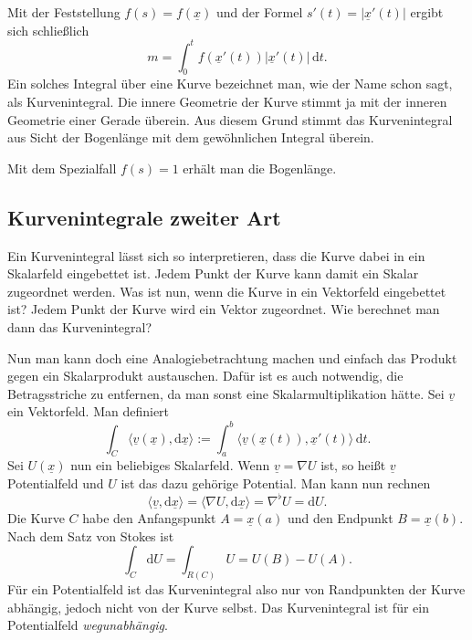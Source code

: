 \documentclass[a4paper,11pt,fleqn,twocolumn,twoside]{scrartcl}
\numberwithin{equation}{section}
\begin{document}
Mit der Feststellung $f(s) = f(\underline x)$ und der Formel
$s'(t) = |\underline x'(t)|$ ergibt sich schließlich
\begin{equation}
m = \int_0^t f(\underline x'(t))|\underline x'(t)|\,\mathrm dt.
\end{equation}
Ein solches Integral über eine Kurve bezeichnet man, wie der Name
schon sagt, als Kurvenintegral. Die innere Geometrie der Kurve stimmt
ja mit der inneren Geometrie einer Gerade überein. Aus diesem Grund
stimmt das Kurvenintegral aus Sicht der Bogenlänge mit dem
gewöhnlichen Integral überein.

Mit dem Spezialfall $f(s)=1$ erhält
man die Bogenlänge.



\subsection{Kurvenintegrale zweiter Art}

Ein Kurvenintegral lässt sich so interpretieren, dass die Kurve
dabei in ein Skalarfeld eingebettet ist. Jedem Punkt der Kurve
kann damit ein Skalar zugeordnet werden. Was ist nun, wenn die
Kurve in ein Vektorfeld eingebettet ist? Jedem Punkt der Kurve
wird ein Vektor zugeordnet. Wie berechnet man dann das Kurvenintegral?

Nun man kann doch eine Analogiebetrachtung machen und einfach das
Produkt gegen ein Skalarprodukt austauschen. Dafür ist es auch
notwendig, die Betragsstriche zu entfernen, da man sonst eine
Skalarmultiplikation hätte. Sei $\underline v$ ein Vektorfeld.
Man definiert
\begin{equation}
\int_C \langle\underline v(\underline x),\mathrm d\underline x\rangle
:= \int_{a}^{b} \langle\underline v(\underline x(t)),
\underline x'(t)\rangle\,\mathrm dt.
\end{equation}
Sei $U(\underline x)$ nun ein beliebiges Skalarfeld. Wenn
$\underline v=\nabla U$ ist, so heißt $\underline v$ Potentialfeld
und $U$ ist das dazu gehörige Potential. Man kann nun rechnen
\begin{equation}
\langle\underline v,\mathrm d\underline x\rangle
= \langle\nabla U,\mathrm d\underline x\rangle
= \nabla^\flat U
= \mathrm dU.
\end{equation}
Die Kurve $C$ habe den Anfangspunkt $A=\underline x(a)$ und den
Endpunkt $B=\underline x(b)$. Nach dem Satz von Stokes ist
\begin{equation}
\int_C \mathrm dU = \int_{R(C)} U = U(B)-U(A).
\end{equation}
Für ein Potentialfeld ist das Kurvenintegral also nur von Randpunkten
der Kurve abhängig, jedoch nicht von der Kurve selbst. Das Kurvenintegral
ist für ein Potentialfeld \textit{wegunabhängig}.
\end{document}
